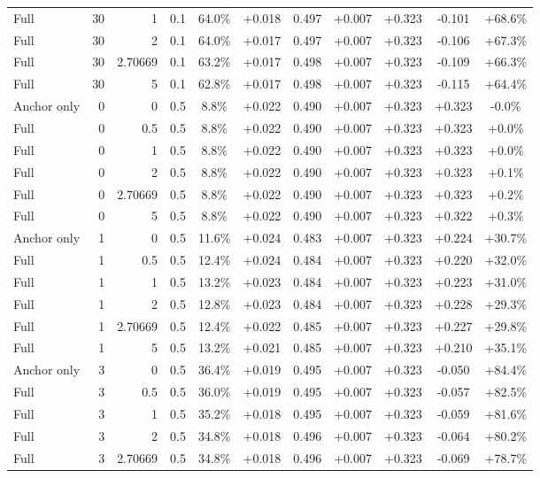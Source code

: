 \begin{table}[htbp]
\begin{tabular}{lrrrccccccc}
Full & 30 & 1 & 0.1 & 64.0\% & +0.018 & 0.497 & +0.007 & +0.323 & -0.101 & +68.6\% \\
Full & 30 & 2 & 0.1 & 64.0\% & +0.017 & 0.497 & +0.007 & +0.323 & -0.106 & +67.3\% \\
Full & 30 & 2.70669 & 0.1 & 63.2\% & +0.017 & 0.498 & +0.007 & +0.323 & -0.109 & +66.3\% \\
Full & 30 & 5 & 0.1 & 62.8\% & +0.017 & 0.498 & +0.007 & +0.323 & -0.115 & +64.4\% \\
Anchor only & 0 & 0 & 0.5 & 8.8\% & +0.022 & 0.490 & +0.007 & +0.323 & +0.323 & -0.0\% \\
Full & 0 & 0.5 & 0.5 & 8.8\% & +0.022 & 0.490 & +0.007 & +0.323 & +0.323 & +0.0\% \\
Full & 0 & 1 & 0.5 & 8.8\% & +0.022 & 0.490 & +0.007 & +0.323 & +0.323 & +0.0\% \\
Full & 0 & 2 & 0.5 & 8.8\% & +0.022 & 0.490 & +0.007 & +0.323 & +0.323 & +0.1\% \\
Full & 0 & 2.70669 & 0.5 & 8.8\% & +0.022 & 0.490 & +0.007 & +0.323 & +0.323 & +0.2\% \\
Full & 0 & 5 & 0.5 & 8.8\% & +0.022 & 0.490 & +0.007 & +0.323 & +0.322 & +0.3\% \\
Anchor only & 1 & 0 & 0.5 & 11.6\% & +0.024 & 0.483 & +0.007 & +0.323 & +0.224 & +30.7\% \\
Full & 1 & 0.5 & 0.5 & 12.4\% & +0.024 & 0.484 & +0.007 & +0.323 & +0.220 & +32.0\% \\
Full & 1 & 1 & 0.5 & 13.2\% & +0.023 & 0.484 & +0.007 & +0.323 & +0.223 & +31.0\% \\
Full & 1 & 2 & 0.5 & 12.8\% & +0.023 & 0.484 & +0.007 & +0.323 & +0.228 & +29.3\% \\
Full & 1 & 2.70669 & 0.5 & 12.4\% & +0.022 & 0.485 & +0.007 & +0.323 & +0.227 & +29.8\% \\
Full & 1 & 5 & 0.5 & 13.2\% & +0.021 & 0.485 & +0.007 & +0.323 & +0.210 & +35.1\% \\
Anchor only & 3 & 0 & 0.5 & 36.4\% & +0.019 & 0.495 & +0.007 & +0.323 & -0.050 & +84.4\% \\
Full & 3 & 0.5 & 0.5 & 36.0\% & +0.019 & 0.495 & +0.007 & +0.323 & -0.057 & +82.5\% \\
Full & 3 & 1 & 0.5 & 35.2\% & +0.018 & 0.495 & +0.007 & +0.323 & -0.059 & +81.6\% \\
Full & 3 & 2 & 0.5 & 34.8\% & +0.018 & 0.496 & +0.007 & +0.323 & -0.064 & +80.2\% \\
Full & 3 & 2.70669 & 0.5 & 34.8\% & +0.018 & 0.496 & +0.007 & +0.323 & -0.069 & +78.7\% \\

\end{tabular}
\end{table}

